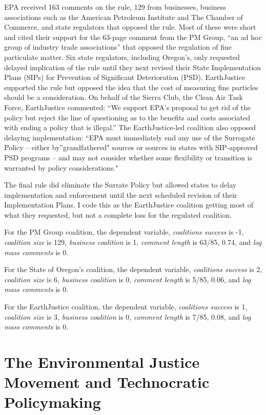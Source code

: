 \documentclass[
]{book}
\begin{document}
EPA received 163 comments on the rule, 129 from businesses, business associations such as the American Petroleum Institute and The Chamber of Commerce, and state regulators that opposed the rule. Most of these were short and cited their support for the 63-page comment from the PM Group, ``an ad hoc group of industry trade associations'' that opposed the regulation of fine particulate matter. Six state regulators, including Oregon's, only requested delayed implication of the rule until they next revised their State Implementation Plans (SIPs) for Prevention of Significant Deterioration (PSD). EarthJustice supported the rule but opposed the idea that the cost of measuring fine particles should be a consideration. On behalf of the Sierra Club, the Clean Air Task Force, EarthJustice commented: ``We support EPA's proposal to get rid of the policy but reject the line of questioning as to the benefits and costs associated with ending a policy that is illegal.'' The EarthJustice-led coalition also opposed delaying implementation: ``EPA must immediately end any use of the Surrogate Policy -- either by''grandfathered" sources or sources in states with SIP‐approved PSD programs -- and may not consider whether some flexibility or transition is warranted by policy considerations."

The final rule did eliminate the Surrate Policy but allowed states to delay implementation and enforcement until the next scheduled revision of their Implementation Plans. I code this as the EarthJustice coalition getting most of what they requested, but not a complete loss for the regulated coalition.

For the PM Group coalition, the dependent variable, \emph{coalitions success} is -1, \emph{coalition size} is 129, \emph{business coalition} is 1, \emph{comment length} is 63/85, 0.74, and \emph{log mass comments} is 0.

For the State of Oregon's coalition, the dependent variable, \emph{coalitions success} is 2, \emph{coalition size} is 6, \emph{business coalition} is 0, \emph{comment length} is 5/85, 0.06, and \emph{log mass comments} is 0.

For the EarthJustice coalition, the dependent variable, \emph{coalitions success} is 1, \emph{coalition size} is 3, \emph{business coalition} is 0, \emph{comment length} is 7/85, 0.08, and \emph{log mass comments} is 0.

\hypertarget{the-environmental-justice-movement-and-technocratic-policymaking}{%
\chapter{The Environmental Justice Movement and Technocratic Policymaking}\label{the-environmental-justice-movement-and-technocratic-policymaking}}
\end{document}
